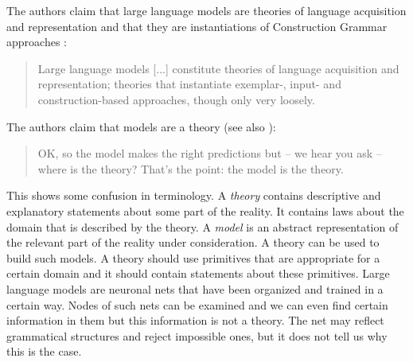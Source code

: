The authors claim that large language models are theories of language acquisition and representation
and that they are instantiations of Construction Grammar approaches \citep{Goldberg2006a}: 
\begin{quote}
Large language models [...] constitute theories of language acquisition and representation; theories
that instantiate exemplar-, input- and construction-based approaches, though only very
loosely. \citep[]{AmbridgeBlything2024a}
\end{quote}

\noindent
The authors claim that models are a theory (see also \citealt[360]{Piantadosi2024a}):
\begin{quote}
OK, so the model makes the right predictions but -- we hear you ask -- where is the theory? That's
the point: the model is the theory.
\citep[]{AmbridgeBlything2024a}
\end{quote}
This shows some confusion in terminology. 
A \emph{theory} contains descriptive and explanatory statements about some part of the reality. It contains
laws about the domain that is described by the theory. A \emph{model} is an abstract representation of the
relevant part of the reality under consideration. A theory can be used to build such models.
A theory should use primitives that are appropriate for a certain domain and it should contain statements about these
primitives. Large language models are neuronal nets that have been organized and trained in a
certain way. Nodes of such nets can be examined and we can even find certain information in them
\citep{ManningClarkHewitt2020a,ZhangBowman2018a} but this information is not a theory. The net may
reflect grammatical structures and reject impossible ones, but it does not tell us why this is the case.

